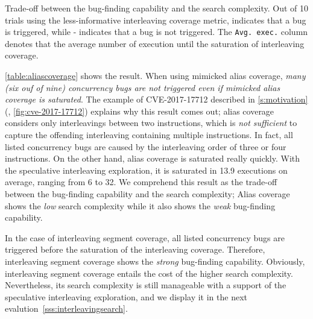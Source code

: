 %
\begin{table}[t]
  \small
  \centering
  
  \caption{Trade-off between the bug-finding capability and the search
    complexity. Out of 10 trials using the less-informative
    interleaving coverage metric, \checkmark\xspace indicates that a
    bug is triggered, while - indicates that a bug is not
    triggered. The \texttt{Avg. exec.}  column denotes that the
    average number of execution until the saturation of interleaving
    coverage.}
  \label{table:aliascoverage}
\end{table}
%
\autoref{table:aliascoverage} shows the result.
%
When using mimicked alias coverage, \textit{many (six ouf of nine)
  concurrency bugs are not triggered even if mimicked alias coverage
  is saturated}.
%
The example of CVE-2017-17712 described in \autoref{s:motivation}
(\ie, \autoref{fig:cve-2017-17712}) explains why this result comes
out; alias coverage considers only interleavings between two
instructions, which is \textit{not sufficient} to capture the
offending interleaving containing multiple instructions. In fact, all
listed concurrency bugs are caused by the interleaving order of three
or four instructions.
%
On the other hand, alias coverage is saturated really quickly. With
the speculative interleaving exploration, it is saturated in 13.9
executions on average, ranging from 6 to 32.
%
We comprehend this result as the trade-off between the bug-finding
capability and the search complexity; Alias coverage shows the
\textit{low} search complexity while it also shows the \textit{weak}
bug-finding capability.
%



In the case of interleaving segment coverage, all listed concurrency
bugs are triggered before the saturation of the interleaving coverage.
Therefore, interleaving segment coverage shows the \textit{strong}
bug-finding capability.
%
Obviously, interleaving segment coverage entails the cost of the
higher search complexity. Nevertheless, its search complexity is still
manageable with a support of the speculative interleaving exploration,
and we display it in the next
evalution~\autoref{sss:interleavingsearch}.






